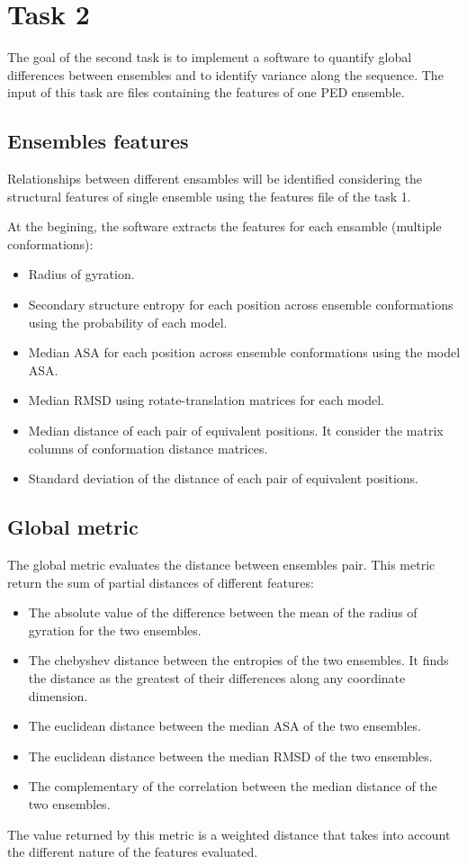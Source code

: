 \section{Task 2}\label{sec:task2}

The goal of the second task is to implement a software to quantify global differences between ensembles and to identify variance along the sequence. The input of this task are files containing the features of one PED ensemble.

\subsection{Ensembles features}
Relationships between different ensambles will be identified considering the structural features of single ensemble using the features file of the task 1.

At the begining, the software extracts the features for each ensamble (multiple conformations):
\begin{itemize}
\item Radius of gyration.
\item Secondary structure entropy for each position across ensemble conformations using the probability of each model.
\item Median ASA for each position across ensemble conformations using the model ASA.
\item Median RMSD using rotate-translation matrices for each model.
\item Median distance of each pair of equivalent positions. It consider the matrix columns of conformation distance matrices.
\item Standard deviation of the distance of each pair of equivalent positions.
\end{itemize}


\subsection{Global metric}
The global metric evaluates the distance between ensembles pair. 
This metric return the sum of partial distances of different features:
\begin{itemize}
\item The absolute value of the difference between the mean of the radius of gyration for the two ensembles.
\item The chebyshev distance between the entropies of the two ensembles. It finds the distance as the greatest of their differences along any coordinate dimension.
\item The euclidean distance between the median ASA of the two ensembles.
\item The euclidean distance between the median RMSD of the two ensembles.
\item The complementary of the correlation between the median distance of the two ensembles.
\end{itemize}
The value returned by this metric is a weighted distance that takes into account the different nature of the features evaluated.

